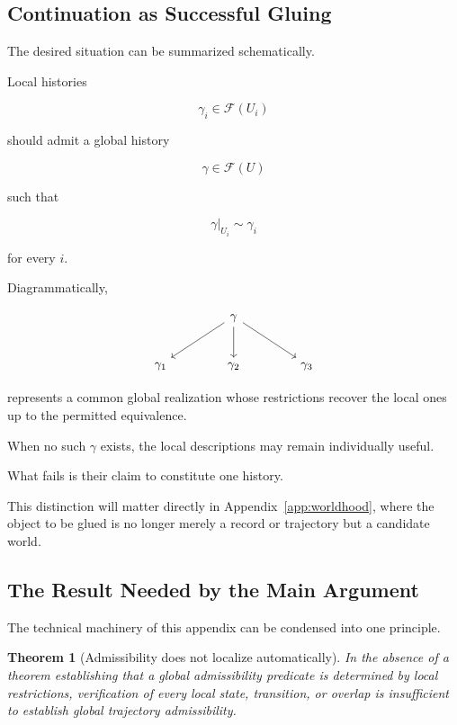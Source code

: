 \documentclass[
  11pt,
  a4paper,
  DIV=12,
  BCOR=0mm,
  parskip=half-
]{scrartcl}
\theoremstyle{definition}
\theoremstyle{plain}
\newtheorem{theorem}[definition]{Theorem}
\theoremstyle{remark}
\begin{document}
\subsection{Continuation as Successful Gluing}
\label{app:continuation-gluing}

The desired situation can be summarized schematically.

Local histories

\[
  \gamma_i\in\mathscr F(U_i)
\]

should admit a global history

\[
  \gamma\in\mathscr F(U)
\]

such that

\[
  \gamma|_{U_i}
  \sim
  \gamma_i
\]

for every \(i\).

Diagrammatically,

\[
\begin{tikzcd}[column sep=4em,row sep=2.5em]
& \gamma \arrow[dl] \arrow[d] \arrow[dr] & \\
\gamma_1 & \gamma_2 & \gamma_3
\end{tikzcd}
\]

represents a common global realization whose restrictions recover the local
ones up to the permitted equivalence.

When no such \(\gamma\) exists, the local descriptions may remain individually
useful.

What fails is their claim to constitute one history.

This distinction will matter directly in Appendix~\ref{app:worldhood}, where
the object to be glued is no longer merely a record or trajectory but a
candidate world.


\subsection{The Result Needed by the Main Argument}
\label{app:admissibility-principle}

The technical machinery of this appendix can be condensed into one principle.

\begin{theorem}[Admissibility does not localize automatically]
\label{thm:admissibility-does-not-localize}
In the absence of a theorem establishing that a global admissibility predicate
is determined by local restrictions, verification of every local state,
transition, or overlap is insufficient to establish global trajectory
admissibility.
\end{theorem}
\end{document}
